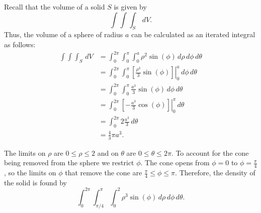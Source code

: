 \begin{activitySolution}

\ba
\item Recall that the volume of a solid $S$ is given by
\[\int \int \int_S \, dV.\]
Thus, the volume of a sphere of radius $a$ can be calculated as an iterated integral as follows:
\begin{align*}
\int \int \int_S \, dV &= \int_0^{2\pi} \int_0^{\pi} \int_0^{a} \rho^2 \sin(\phi) \, d\rho \, d\phi \, d\theta \\
	&= \int_0^{2\pi} \int_0^{\pi} \left. \left[\frac{\rho^3}{3} \sin(\phi) \right]\right|_0^a  \, d\phi \, d\theta \\
	&= \int_0^{2\pi} \int_0^{\pi} \frac{a^3}{3} \sin(\phi) \, d\phi \, d\theta \\
	&= \int_0^{2\pi} \left. \left[-\frac{a^3}{3} \cos(\phi)\right]\right|_0^{\pi} \, d\theta \\
	&= \int_0^{2\pi} 2\frac{a^3}{3} \, d\theta \\
	&= \frac{4}{3}\pi a^3.
\end{align*}


\item The limits on $\rho$ are $0 \leq \rho \leq 2$ and on $\theta$ are $0 \leq \theta \leq 2\pi$. To account for the cone being removed from the sphere we restrict $\phi$. The cone opens from $\phi = 0$ to $\phi = \frac{\pi}{4}$, so the limits on $\phi$ that remove the cone are $\frac{\pi}{4} \leq \phi \leq \pi$. Therefore, the density of the solid is found by 
\[\int_{0}^{2\pi} \int_{\pi/4}^{\pi} \int_0^2 \rho^3 \sin(\phi) \, d\rho \, d\phi \, d\theta.\]
\ea

\end{activitySolution}
\aftera

